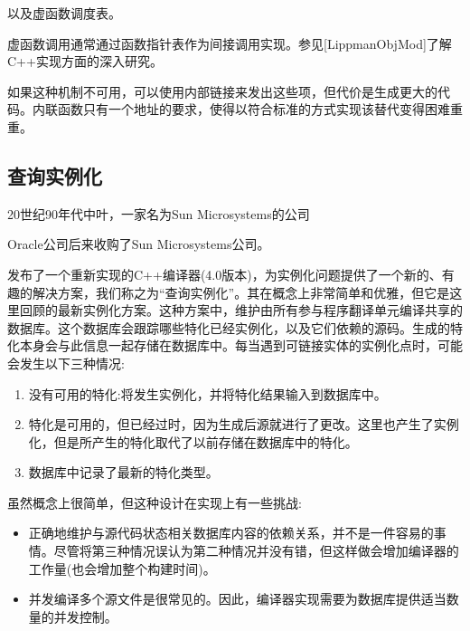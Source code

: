 以及虚函数调度表。

\begin{notice}
虚函数调用通常通过函数指针表作为间接调用实现。参见[LippmanObjMod]了解C++实现方面的深入研究。
\end{notice}

如果这种机制不可用，可以使用内部链接来发出这些项，但代价是生成更大的代码。内联函数只有一个地址的要求，使得以符合标准的方式实现该替代变得困难重重。

\subsection{查询实例化}

20世纪90年代中叶，一家名为Sun Microsystems的公司

\begin{notice}
Oracle公司后来收购了Sun Microsystems公司。
\end{notice}

发布了一个重新实现的C++编译器(4.0版本)，为实例化问题提供了一个新的、有趣的解决方案，我们称之为“查询实例化”。其在概念上非常简单和优雅，但它是这里回顾的最新实例化方案。这种方案中，维护由所有参与程序翻译单元编译共享的数据库。这个数据库会跟踪哪些特化已经实例化，以及它们依赖的源码。生成的特化本身会与此信息一起存储在数据库中。每当遇到可链接实体的实例化点时，可能会发生以下三种情况:

\begin{enumerate}
\item 
没有可用的特化:将发生实例化，并将特化结果输入到数据库中。

\item 
特化是可用的，但已经过时，因为生成后源就进行了更改。这里也产生了实例化，但是所产生的特化取代了以前存储在数据库中的特化。

\item 
数据库中记录了最新的特化类型。
\end{enumerate}

虽然概念上很简单，但这种设计在实现上有一些挑战:

\begin{itemize}
\item 
正确地维护与源代码状态相关数据库内容的依赖关系，并不是一件容易的事情。尽管将第三种情况误认为第二种情况并没有错，但这样做会增加编译器的工作量(也会增加整个构建时间)。

\item 
并发编译多个源文件是很常见的。因此，编译器实现需要为数据库提供适当数量的并发控制。
\end{itemize}

